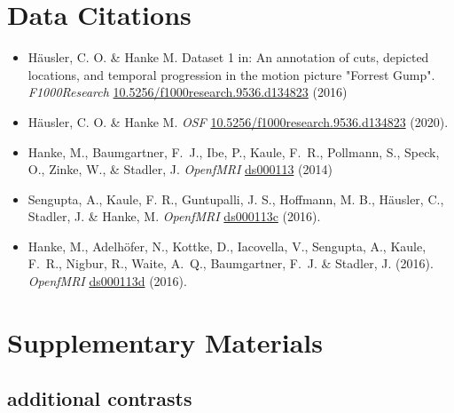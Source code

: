 \documentclass[english]{article}
\begin{document}
\section{Data Citations}

\begin{itemize}
\item Häusler, C. O. \& Hanke M. Dataset 1 in: An annotation of cuts, depicted
locations, and temporal progression in the motion picture "Forrest Gump".
\emph{F1000Research}
\href{https://doi.org/10.5256/f1000research.9536.d134823}{10.5256/f1000research.9536.d134823}
(2016)

\item Häusler, C. O. \& Hanke M. \emph{OSF}
\href{https://doi.org/10.17605/OSF.IO/GFRME}{10.5256/f1000research.9536.d134823}
(2020).

\item Hanke, M., Baumgartner, F.~J., Ibe, P., Kaule, F.~R., Pollmann, S., Speck, O.,
  Zinke, W., \& Stadler, J. \emph{OpenfMRI} \href{https://openfmri.org/dataset/ds000113}{ds000113} (2014)

\item Sengupta, A., Kaule, F. R., Guntupalli, J. S., Hoffmann, M. B., Häusler, C., Stadler, J. \& Hanke, M.
  \emph{OpenfMRI} \href{https://openfmri.org/dataset/ds000113c}{ds000113c} (2016).

\item Hanke, M., Adelhöfer, N., Kottke, D., Iacovella, V., Sengupta, A., Kaule, F.~R., Nigbur, R., Waite, A.~Q.,
  Baumgartner, F.~J. \& Stadler, J. (2016).
  \emph{OpenfMRI} \href{https://openfmri.org/dataset/ds000113d}{ds000113d} (2016).
\end{itemize}


\appendix

\pagebreak[4]

\setcounter{figure}{0}
\makeatletter
\renewcommand{\thefigure}{S\@arabic\c@figure}
\makeatother

\section{Supplementary Materials}


\subsection{additional contrasts}

\end{document}
